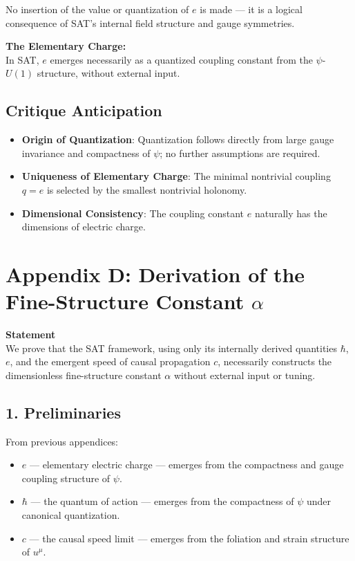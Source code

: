 \documentclass[12pt]{article}
\begin{document}
No insertion of the value or quantization of \(e\) is made — it is a logical consequence of SAT’s internal field structure and gauge symmetries.

\begin{mdframed}[linewidth=1pt, roundcorner=5pt, backgroundcolor=white]
\textbf{The Elementary Charge:} \\
In SAT, \( e \) emerges necessarily as a quantized coupling constant from the \( \psi \)-\( U(1) \) structure, without external input.
\end{mdframed}



\subsection*{Critique Anticipation}
\begin{itemize}
    \item \textbf{Origin of Quantization}: Quantization follows directly from large gauge invariance and compactness of \(\psi\); no further assumptions are required.
    \item \textbf{Uniqueness of Elementary Charge}: The minimal nontrivial coupling \(q = e\) is selected by the smallest nontrivial holonomy.
    \item \textbf{Dimensional Consistency}: The coupling constant \(e\) naturally has the dimensions of electric charge.
\end{itemize}
\newpage

\section*{Appendix D: Derivation of the Fine-Structure Constant \(\alpha\)}

\textbf{Statement} \\
We prove that the SAT framework, using only its internally derived quantities \(\hbar\), \(e\), and the emergent speed of causal propagation \(c\), necessarily constructs the dimensionless fine-structure constant \(\alpha\) without external input or tuning.

\subsection*{1. Preliminaries}
From previous appendices:
\begin{itemize}
    \item \(e\) — elementary electric charge — emerges from the compactness and gauge coupling structure of \(\psi\).
    \item \(\hbar\) — the quantum of action — emerges from the compactness of \(\psi\) under canonical quantization.
    \item \(c\) — the causal speed limit — emerges from the foliation and strain structure of \(u^\mu\).
\end{itemize}
\end{document}
